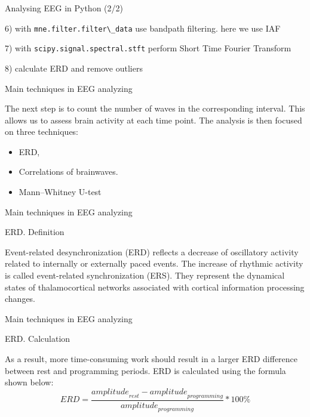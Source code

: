 \documentclass{beamer}
\begin{document}
\begin{frame}
{\centerline{Analysing EEG in Python (2/2)}}

6) with \verb|mne.filter.filter\_data| use bandpath filtering. here we use IAF

7) with \verb|scipy.signal.spectral.stft| perform Short Time Fourier Transform

8) calculate ERD and remove outliers
    
\end{frame}

\begin{frame}
{\centerline{Main techniques in EEG analyzing}}
The next step is to count the number of waves in the corresponding interval. This allows us to assess brain activity at each time point. The analysis is then focused on three techniques:
\begin{itemize}
    \item ERD,
    \item Correlations of brainwaves.
    \item Mann–Whitney U-test
\end{itemize}
\end{frame}


\begin{frame}
{\centerline{Main techniques in EEG analyzing}}
{\centerline{ERD. Definition}}
Event-related desynchronization (ERD) reflects a decrease of oscillatory activity related to internally or externally paced events. The increase of rhythmic activity is called event-related synchronization (ERS). They represent the dynamical states of thalamocortical networks associated with cortical information processing changes.
\end{frame}


\begin{frame}
{\centerline{Main techniques in EEG analyzing}}
{\centerline{ERD. Calculation}}
As a result, more time-consuming work should result in a larger ERD difference between rest and programming periods. ERD is calculated using the formula shown below:
\begin{equation}
    ERD=\frac{{amplitude}_{rest}-{amplitude}_{programming}}{{amplitude}_{programming}}*100\%
\end{equation}
\end{frame}
\end{document}
